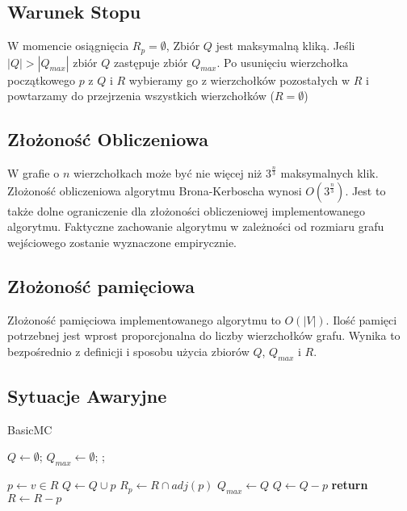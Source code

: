\documentclass[12pt, a4paper]{article}
\begin{document}
\subsection{Warunek Stopu}

W momencie osiągnięcia $R_{p} = \emptyset$, Zbiór $Q$ jest maksymalną kliką. Jeśli $|Q| > |Q_{max}|$ zbiór $Q$ zastępuje zbiór $Q_{max}$. Po usunięciu wierzchołka początkowego $p$ z $Q$ i $R$ wybieramy go z wierzchołków pozostałych w $R$ i powtarzamy do przejrzenia wszystkich wierzchołków ($R = \emptyset$)

\subsection{Złożoność Obliczeniowa}
W grafie o $n$ wierzchołkach może być nie więcej niż $3^{\frac{n}{3}}$ maksymalnych klik. Złożoność obliczeniowa algorytmu Brona-Kerboscha wynosi $O(3^{\frac{n}{3}})$.
Jest to także dolne ograniczenie dla złożoności obliczeniowej implementowanego algorytmu. Faktyczne zachowanie algorytmu w zależności od rozmiaru grafu wejściowego zostanie wyznaczone empirycznie.

\subsection{Złożoność pamięciowa}
\label{memory_complexity}

Złożoność pamięciowa implementowanego algorytmu to $O(|V|)$. Ilość pamięci potrzebnej jest wprost proporcjonalna do liczby wierzchołków grafu. Wynika to bezpośrednio z definicji i sposobu użycia zbiorów $Q$, $Q_{max}$ i $R$.

\subsection{Sytuacje Awaryjne}

\begin{algorithm}
\caption{BasicMC}\label{basicmc}
\begin{algorithmic}[1]
  
\State $Q\gets \emptyset$;
\State $Q_{max}\gets \emptyset$;
\State {};
\EndProcedure
\Statex

  \State $p\gets v\in R$
    \State $Q \gets Q \cup {p}$\label{addPToQ}
    \State $R_p \gets R \cap adj(p)$
      \State {}
      \State $Q_{max} \gets Q$
    \EndIf
    \State $Q \gets Q - {p}$
  \Else
    \textbf{ return}\label{skip}
  \EndIf
  \State $R \gets R - p$
\EndWhile
\EndProcedure

\end{algorithmic}
\end{algorithm}
\end{document}
